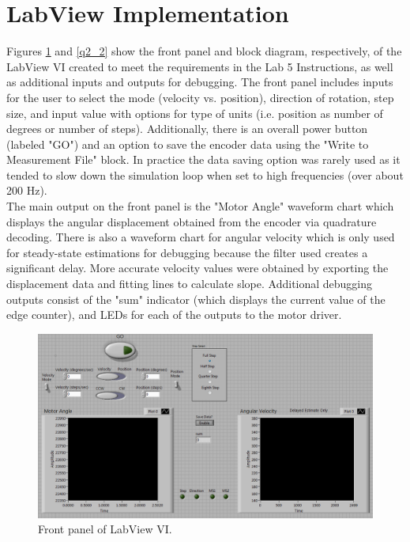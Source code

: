 \documentclass{article}
\theoremstyle{plain}
\theoremstyle{definition}
\theoremstyle{remark}
\begin{document}
\section{LabView Implementation}
Figures \ref{q2_1} and \ref{q2_2} show the front panel and block diagram, respectively, of the LabView VI created to meet the requirements in the Lab 5 Instructions, as well as additional inputs and outputs for debugging. The front panel includes inputs for the user to select the mode (velocity vs. position), direction of rotation, step size, and input value with options for type of units (i.e. position as number of degrees or number of steps). Additionally, there is an overall power button (labeled "GO") and an option to save the encoder data using the "Write to Measurement File" block. In practice the data saving option was rarely used as it tended to slow down the simulation loop when set to high frequencies (over about 200 Hz).\\

The main output on the front panel is the "Motor Angle" waveform chart which displays the angular displacement obtained from the encoder via quadrature decoding. There is also a waveform chart for angular velocity which is only used for steady-state estimations for debugging because the filter used creates a significant delay. More accurate velocity values were obtained by exporting the displacement data and fitting lines to calculate slope. Additional debugging outputs consist of the "sum" indicator (which displays the current value of the edge counter), and LEDs for each of the outputs to the motor driver.     \\


\begin{figure}[hbt]
\begin{center}
\includegraphics[width = 18cm]{VIFrontPanel.png}
\caption{Front panel of LabView VI.}
\label{q2_1}
\end{center}
\end{figure}
\end{document}
